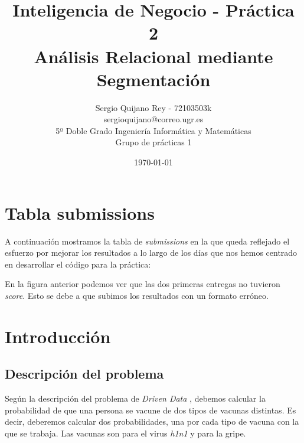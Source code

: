 \documentclass[11pt]{article}
\title{
    {Inteligencia de Negocio - Práctica 2} \\
    {Análisis Relacional mediante Segmentación}
}
\author{
    {Sergio Quijano Rey - 72103503k}\\
    {sergioquijano@correo.ugr.es} \\
    {5º Doble Grado Ingeniería Informática y Matemáticas} \\
    {Grupo de prácticas 1}\\
}
\date{\today}
\begin{document}
\maketitle
\pagebreak

\tableofcontents


\listoffigures

\listoftables

{}

\pagebreak

\section{Tabla submissions}

A continuación mostramos la tabla de \emph{submissions} en la que queda reflejado el esfuerzo por mejorar los resultados a lo largo de los días que nos hemos centrado en desarrollar el código para la práctica:


En la figura anterior podemos ver que las dos primeras entregas no tuvieron \emph{score}. Esto se debe a que subimos los resultados con un formato erróneo.

\pagebreak

\section{Introducción}

\subsection{Descripción del problema}

Según la descripción del problema de \emph{Driven Data} \cite{driven_data_problem_description:online}, debemos calcular la probabilidad de que una persona se vacune de dos tipos de vacunas distintas. Es decir, deberemos calcular dos probabilidades, una por cada tipo de vacuna con la que se trabaja. Las vacunas son para el virus \emph{h1n1} y para la gripe.
\end{document}
